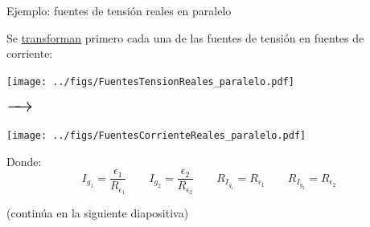 \documentclass[aspectratio=169, xcolor={usenames,svgnames,dvipsnames}]{beamer}
\begin{document}
\begin{frame}{Ejemplo: \hspace{3mm}fuentes de tensión reales en paralelo}

    \vspace{2mm}
    Se \hyperlink{diapo:transformacion_fuentes}{transforman} primero cada una de las fuentes de tensión en fuentes de corriente:

    \vspace{2mm}
    \begin{minipage}[c]{0.38\linewidth}
        \begin{center}
        \texttt{[image: ../figs/FuentesTensionReales\_paralelo.pdf]}
        \end{center}
    \end{minipage}
    \begin{minipage}[c]{0.08\linewidth}
        \begin{center}
        $\LARGE \xrightarrow{\hspace*{0.5cm}}$ %
        \end{center}
    \end{minipage}
    \begin{minipage}[c]{0.4\linewidth}
        \begin{center}
        \texttt{[image: ../figs/FuentesCorrienteReales\_paralelo.pdf]}
        \end{center}
    \end{minipage}

    \vspace{4mm}
    
    Donde:
    \[
      I_{g_1} = \frac{\epsilon_1}{R_{\epsilon_1}} \qquad I_{g_2} = \frac{\epsilon_2}{R_{\epsilon_2}} \qquad R_{I_{g_1}} = R_{\epsilon_1} \qquad R_{I_{g_2}} = R_{\epsilon_2}
    \]

    \vspace{2mm}
    \centering \small{(continúa en la siguiente diapositiva)}
\end{frame}

\end{document}
